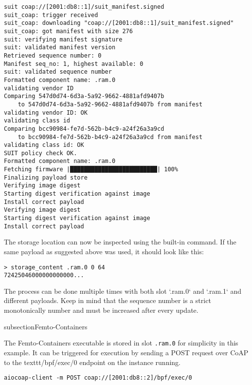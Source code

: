 \documentclass[../main.tex]{subfiles}
\begin{document}
\begin{lstlisting}
suit coap://[2001:db8::1]/suit_manifest.signed
suit_coap: trigger received
suit_coap: downloading "coap://[2001:db8::1]/suit_manifest.signed"
suit_coap: got manifest with size 276
suit: verifying manifest signature
suit: validated manifest version
Retrieved sequence number: 0
Manifest seq_no: 1, highest available: 0
suit: validated sequence number
Formatted component name: .ram.0
validating vendor ID
Comparing 547d0d74-6d3a-5a92-9662-4881afd9407b
	to 547d0d74-6d3a-5a92-9662-4881afd9407b from manifest
validating vendor ID: OK
validating class id
Comparing bcc90984-fe7d-562b-b4c9-a24f26a3a9cd
	to bcc90984-fe7d-562b-b4c9-a24f26a3a9cd from manifest
validating class id: OK
SUIT policy check OK.
Formatted component name: .ram.0
Fetching firmware |█████████████████████████| 100%
Finalizing payload store
Verifying image digest
Starting digest verification against image
Install correct payload
Verifying image digest
Starting digest verification against image
Install correct payload
\end{lstlisting}

The storage location can now be inspected using the built-in command. If the
same payload as suggested above was used, it should look like this:

\begin{lstlisting}
> storage_content .ram.0 0 64
72425046000000000000...
\end{lstlisting}

The process can be done multiple times with both slot `.ram.0` and `.ram.1` and
different payloads. Keep in mind that the sequence number is a strict
monotonically number and must be increased after every update.

subsection{Femto-Containers}

The Femto-Containers executable is stored in slot \texttt{.ram.0} for simplicity in
this example. It can be triggered for execution by sending a POST request over
CoAP to the texttt{/bpf/exec/0} endpoint on the instance running.

\begin{lstlisting}
aiocoap-client -m POST coap://[2001:db8::2]/bpf/exec/0
\end{lstlisting}
\end{document}
